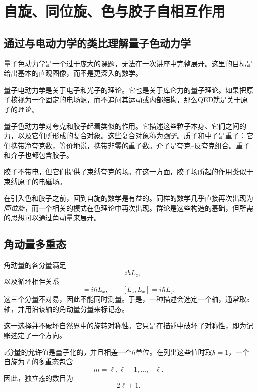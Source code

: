\chapter{自旋、同位旋、色与胶子自相互作用}

\section{通过与电动力学的类比理解量子色动力学}

量子色动力学是一个过于庞大的课题，无法在一次讲座中完整展开。这里的目标是给出基本的直观图像，而不是更深入的数学。

量子电动力学是关于电子和光子的理论。它也是关于库仑力的量子理论。如果把原子核视为一个固定的电场源，而不追问其运动或内部结构，那么QED就是关于原子的理论。

量子色动力学对夸克和胶子起着类似的作用。它描述这些粒子本身、它们之间的力，以及它们所形成的复合对象。这些复合对象称为\emph{强子}。质子和中子是重子：它们携带净夸克数，等价地说，携带非零的重子数。介子是夸克--反夸克组合。重子和介子也都包含胶子。

胶子不带电，但它们提供了束缚夸克的场。在这一方面，胶子场所起的作用类似于束缚原子的电磁场。

在引入色和胶子之前，回到自旋的数学是有益的。同样的数学几乎直接再次出现为\emph{同位旋}，而一个相关的模式在色理论中再次出现。群论是这些构造的基础，但所需的思想可以通过角动量来展开。

\section{角动量多重态}

角动量的各分量满足
\begin{equation}
[L_x,L_y]=i\hbar L_z,
\end{equation}
以及循环相伴关系
\begin{equation}
[L_y,L_z]=i\hbar L_x,
\qquad
[L_z,L_x]=i\hbar L_y.
\end{equation}
这三个分量不对易，因此不能同时测量。于是，一种描述会选定一个轴，通常取\(z\)轴，并用沿该轴的角动量分量来标记态。

这一选择并不破坏自然界中的旋转对称性。它只是在描述中破坏了对称性，即为记账选定了一个方向。

\(z\)分量的允许值是量子化的，并且相差一个\(\hbar\)单位。在列出这些值时取\(\hbar=1\)，一个自旋为\(\ell\)的多重态包含
\begin{equation}
m=\ell,\ell-1,\ldots,-\ell.
\end{equation}
因此，独立态的数目为
\begin{equation}
2\ell+1.
\end{equation}

